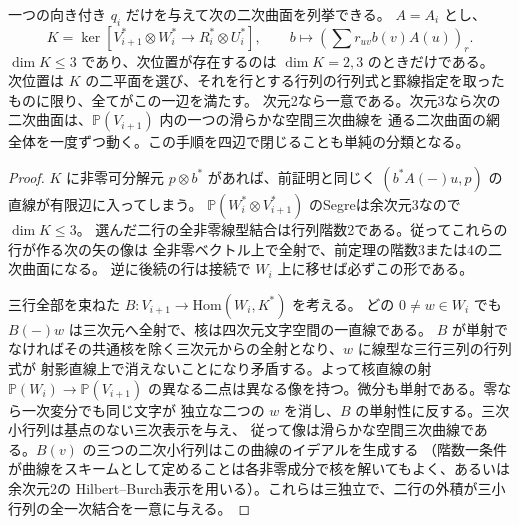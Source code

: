 \begin{proposition}\label{prop:two-dimensional-quadric-successors}
一つの向き付き $q_i$ だけを与えて次の二次曲面を列挙できる。
$A=A_i$ とし、
\[
 K=\ker\left[V_{i+1}^*\otimes W_i^*\longrightarrow R_i^*\otimes U_i^*\right],
 \qquad b\longmapsto\left(\sum r_{uv} b(v)A(u)\right)_r .
\]
$\dim K\le3$ であり、次位置が存在するのは $\dim K=2,3$ のときだけである。
次位置は $K$ の二平面を選び、それを行とする行列の行列式と罫線指定を取ったものに限り、全てがこの一辺を満たす。
次元2なら一意である。次元3なら次の二次曲面は、$\mathbb P(V_{i+1})$ 内の一つの滑らかな空間三次曲線を
通る二次曲面の網全体を一度ずつ動く。この手順を四辺で閉じることも単純の分類となる。
\end{proposition}
\begin{proof}
$K$ に非零可分解元 $p\otimes b^*$ があれば、前証明と同じく
$(b^*A(-)u,p)$ の直線が有限辺に入ってしまう。
$\mathbb P(W_i^*\otimes V_{i+1}^*)$ のSegreは余次元3なので $\dim K\le3$。
選んだ二行の全非零線型結合は行列階数2である。従ってこれらの行が作る次の矢の像は
全非零ベクトル上で全射で、前定理の階数3または4の二次曲面になる。
逆に後続の行は接続で $W_i$ 上に移せば必ずこの形である。

三行全部を束ねた $B:V_{i+1}\to\mathrm{Hom}(W_i,K^*)$ を考える。
どの $0\ne w\in W_i$ でも $B(-)w$ は三次元へ全射で、核は四次元文字空間の一直線である。
$B$ が単射でなければその共通核を除く三次元からの全射となり、$w$ に線型な三行三列の行列式が
射影直線上で消えないことになり矛盾する。よって核直線の射 $\mathbb P(W_i)\to\mathbb P(V_{i+1})$
の異なる二点は異なる像を持つ。微分も単射である。零なら一次変分でも同じ文字が
独立な二つの $w$ を消し、$B$ の単射性に反する。三次小行列は基点のない三次表示を与え、
従って像は滑らかな空間三次曲線である。$B(v)$ の三つの二次小行列はこの曲線のイデアルを生成する
（階数一条件が曲線をスキームとして定めることは各非零成分で核を解いてもよく、あるいは余次元2の
Hilbert--Burch表示を用いる）。これらは三独立で、二行の外積が三小行列の全一次結合を一意に与える。
\end{proof}
